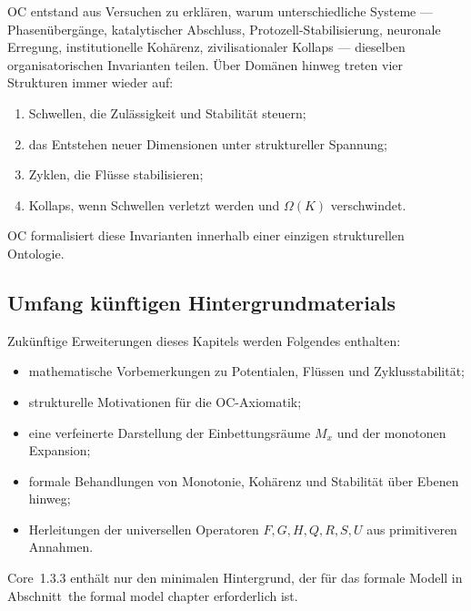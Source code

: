 OC entstand aus Versuchen zu erklären, warum unterschiedliche Systeme --- Phasenübergänge, katalytischer Abschluss, Protozell-Stabilisierung, neuronale Erregung, institutionelle Kohärenz, zivilisationaler Kollaps --- dieselben organisatorischen Invarianten teilen.  
Über Domänen hinweg treten vier Strukturen immer wieder auf:

\begin{enumerate}
    \item Schwellen, die Zulässigkeit und Stabilität steuern;
    \item das Entstehen neuer Dimensionen unter struktureller Spannung;
    \item Zyklen, die Flüsse stabilisieren;
    \item Kollaps, wenn Schwellen verletzt werden und \(\Omega(K)\) verschwindet.
\end{enumerate}

OC formalisiert diese Invarianten innerhalb einer einzigen strukturellen Ontologie.

\subsection{Umfang künftigen Hintergrundmaterials}

Zukünftige Erweiterungen dieses Kapitels werden Folgendes enthalten:

\begin{itemize}
    \item mathematische Vorbemerkungen zu Potentialen, Flüssen und Zyklusstabilität;
    \item strukturelle Motivationen für die OC-Axiomatik;
    \item eine verfeinerte Darstellung der Einbettungsräume \(M_x\) und der monotonen Expansion;
    \item formale Behandlungen von Monotonie, Kohärenz und Stabilität über Ebenen hinweg;
    \item Herleitungen der universellen Operatoren \(F,G,H,Q,R,S,U\) aus primitiveren Annahmen.
\end{itemize}

Core~1.3.3 enthält nur den minimalen Hintergrund, der für das formale Modell in Abschnitt~the formal model chapter erforderlich ist.

